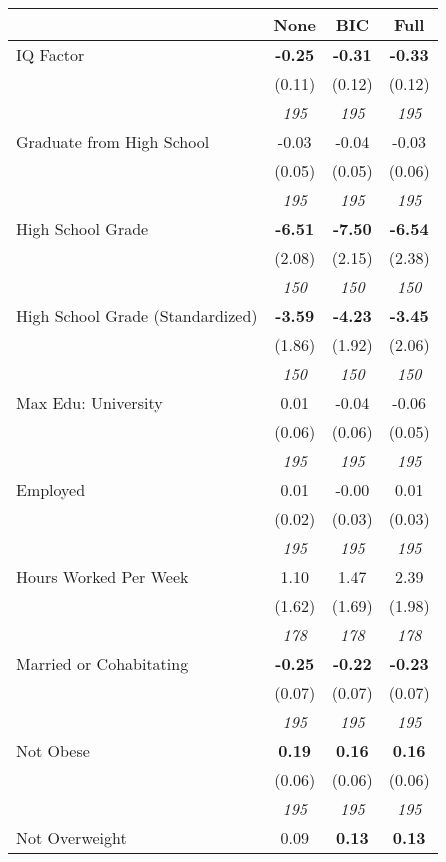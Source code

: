 \begin{tabular}{l c c c}
\toprule
 & None & BIC & Full \\
\midrule
IQ Factor & \textbf{ -0.25 } & \textbf{ -0.31 } & \textbf{ -0.33 } \\
& (0.11) & (0.12) & (0.12) \\
& \textit{ 195 } & \textit{ 195 } & \textit{ 195 } \\
Graduate from High School & -0.03 & -0.04 & -0.03 \\
& (0.05) & (0.05) & (0.06) \\
& \textit{ 195 } & \textit{ 195 } & \textit{ 195 } \\
High School Grade & \textbf{ -6.51 } & \textbf{ -7.50 } & \textbf{ -6.54 } \\
& (2.08) & (2.15) & (2.38) \\
& \textit{ 150 } & \textit{ 150 } & \textit{ 150 } \\
High School Grade (Standardized) & \textbf{ -3.59 } & \textbf{ -4.23 } & \textbf{ -3.45 } \\
& (1.86) & (1.92) & (2.06) \\
& \textit{ 150 } & \textit{ 150 } & \textit{ 150 } \\
Max Edu: University & 0.01 & -0.04 & -0.06 \\
& (0.06) & (0.06) & (0.05) \\
& \textit{ 195 } & \textit{ 195 } & \textit{ 195 } \\
Employed & 0.01 & -0.00 & 0.01 \\
& (0.02) & (0.03) & (0.03) \\
& \textit{ 195 } & \textit{ 195 } & \textit{ 195 } \\
Hours Worked Per Week & 1.10 & 1.47 & 2.39 \\
& (1.62) & (1.69) & (1.98) \\
& \textit{ 178 } & \textit{ 178 } & \textit{ 178 } \\
Married or Cohabitating & \textbf{ -0.25 } & \textbf{ -0.22 } & \textbf{ -0.23 } \\
& (0.07) & (0.07) & (0.07) \\
& \textit{ 195 } & \textit{ 195 } & \textit{ 195 } \\
Not Obese & \textbf{ 0.19 } & \textbf{ 0.16 } & \textbf{ 0.16 } \\
& (0.06) & (0.06) & (0.06) \\
& \textit{ 195 } & \textit{ 195 } & \textit{ 195 } \\
Not Overweight & 0.09 & \textbf{ 0.13 } & \textbf{ 0.13 } \\

\end{tabular}
